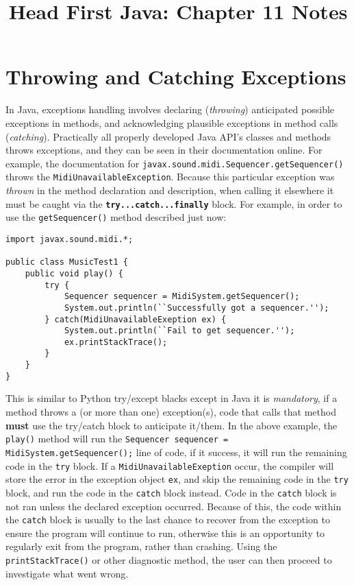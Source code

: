 \documentclass{tufte-handout}
\title{Head First Java: Chapter 11 Notes}
\begin{document}
    \maketitle

    \section*{Throwing and Catching Exceptions}
    In Java, exceptions handling involves declaring (\emph{throwing}) anticipated possible exceptions in methods, and acknowledging plausible exceptions in method calls (\emph{catching}). Practically all properly developed Java API's classes and methods throws exceptions, and they can be seen in their documentation online. For example, the documentation for \texttt{javax.sound.midi.Sequencer.getSequencer()} throws the \texttt{MidiUnavailableException}. Because this particular exception was \emph{thrown} in the method declaration and description, when calling it elsewhere it must be caught via the \texttt{\textbf{try...catch...finally}} block. For example, in order to use the \texttt{getSequencer()} method described just now:

    \begin{lstlisting}
import javax.sound.midi.*;

public class MusicTest1 {
    public void play() {
        try {
            Sequencer sequencer = MidiSystem.getSequencer();
            System.out.println(``Successfully got a sequencer.'');
        } catch(MidiUnavailableExeption ex) {
            System.out.println(``Fail to get sequencer.'');
            ex.printStackTrace();
        }
    }
}
    \end{lstlisting}

    This is similar to Python try/except blacks except in Java it is \emph{mandatory}, if a method throws a (or more than one) exception(s), code that calls that method \textbf{must} use the try/catch block to anticipate it/them. In the above example, the \texttt{play()} method will run the \texttt{Sequencer sequencer = MidiSystem.getSequencer();} line of code, if it success, it will run the remaining code in the \texttt{try} block. If a \texttt{MidiUnavailableExeption} occur, the compiler will store the error in the exception object \texttt{ex}, and skip the remaining code in the \texttt{try} block, and run the code in the \texttt{catch} block instead. Code in the \texttt{catch} block is not ran unless the declared exception occurred. Because of this, the code within the \texttt{catch} block is usually to the last chance to recover from the exception to ensure the program will continue to run, otherwise this is an opportunity to regularly exit from the program, rather than crashing. Using the \texttt{printStackTrace()} or other diagnostic method, the user can then proceed to investigate what went wrong.
\end{document}
